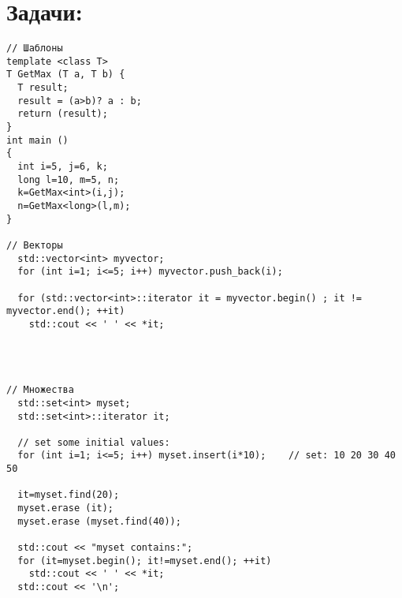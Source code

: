 \documentclass{article}
\begin{document}
\section*{Задачи:}
\begin{multicols}{2}
\begin{lstlisting}
// Шаблоны
template <class T>
T GetMax (T a, T b) {
  T result;
  result = (a>b)? a : b;
  return (result);
}
int main () 
{
  int i=5, j=6, k;
  long l=10, m=5, n;
  k=GetMax<int>(i,j);
  n=GetMax<long>(l,m);
}

// Векторы
  std::vector<int> myvector;
  for (int i=1; i<=5; i++) myvector.push_back(i);

  for (std::vector<int>::iterator it = myvector.begin() ; it != myvector.end(); ++it)
    std::cout << ' ' << *it;




// Множества
  std::set<int> myset;
  std::set<int>::iterator it;

  // set some initial values:
  for (int i=1; i<=5; i++) myset.insert(i*10);    // set: 10 20 30 40 50

  it=myset.find(20);
  myset.erase (it);
  myset.erase (myset.find(40));

  std::cout << "myset contains:";
  for (it=myset.begin(); it!=myset.end(); ++it)
    std::cout << ' ' << *it;
  std::cout << '\n';
\end{lstlisting}
\begin{center}
\end{center}
\end{multicols}
\end{document}
